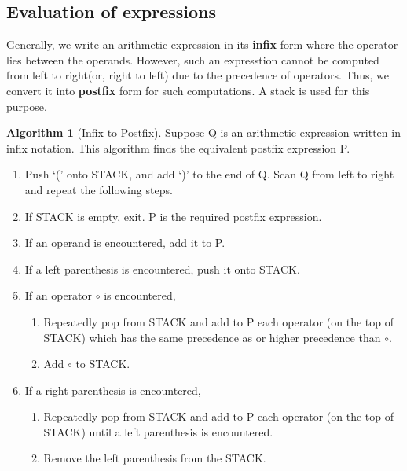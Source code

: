 \documentclass[10pt, a4paper]{extarticle}
\theoremstyle{definition}
\newtheorem{alg}{Algorithm}
\begin{document}
	\subsection{Evaluation of expressions}
	Generally, we write an arithmetic expression in its \textbf{infix} form where the operator lies between the operands. However, such an expresstion cannot be computed from left to right(or, right to left) due to the precedence of operators. Thus, we convert it into \textbf{postfix} form for such computations. A stack is used for this purpose.
	\begin{alg}[Infix to Postfix]
		Suppose Q is an arithmetic expression written in infix notation. This algorithm finds the equivalent postfix expression P.
		\begin{enumerate}
			\item Push `(' onto STACK, and add `)' to the end of Q. Scan Q from left to right and repeat the following steps.
			\item If STACK is empty, exit. P is the required postfix expression.
			\item If an operand is encountered, add it to P.
			\item  If a left parenthesis is encountered, push it onto STACK.
			\item  If an operator $\circ$ is encountered,
				\begin{enumerate}
					\item Repeatedly pop from STACK and add to P each operator (on the top of STACK) which has the same precedence as or higher precedence than $\circ$.
					\item Add $\circ$ to STACK.
			\end{enumerate}
			
			\item If a right parenthesis is encountered,
				\begin{enumerate}
					\item Repeatedly pop from STACK and add to P each operator (on the top of STACK) until a left parenthesis is encountered.
					\item Remove the left parenthesis from the STACK.
			\end{enumerate}
	\end{enumerate}
	\end{alg}
\end{document}
